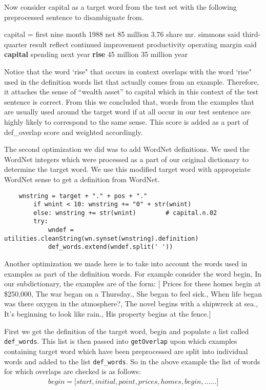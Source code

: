 \documentclass{article}
\begin{document}
Now consider capital as a target word from the test set with the following preprocessed sentence to disambiguate from. \par

capital = first nine month 1988 net 85 million 3.76 share mr. simmons said third-quarter result reflect continued improvement productivity operating margin said \textbf{capital} spending next year \textbf{rise} 45 million 35 million year
\par
Notice that the word `rise" that occurs in context overlaps with the word `rise" used in the definition words list that actually comes from an example. Therefore, it attaches the sense of ``wealth asset'' to capital which in this context of the test sentence is correct. From this we concluded that, words from the examples that are usually used around the target word if at all occur in our test sentence are highly likely to correspond to the same sense. This score is added as a part of def\_overlap score and weighted accordingly.

The second optimization we did was to add WordNet definitions. We used the WordNet integers which were processed as a part of our original dictionary to determine the target word. We use this modified target word with appropriate WordNet sense to get a definition from WordNet. 

\begin{verbatim}
    wnstring = target + "." + pos + "."
        if wnint < 10: wnstring += "0" + str(wnint)
        else: wnstring += str(wnint)        # capital.n.02
        try:
            wndef = utilities.cleanString(wn.synset(wnstring).definition)
            def_words.extend(wndef.split(' '))
\end{verbatim}

Another optimization we made here is to take into account the words used in examples as part of the definition words. For example consider the word begin, In our subdictionary, the examples are of the form: 
$\lbrack$ Prices for these homes begin at \$250,000, The war began on a Thursday., She began to feel sick., When life began was there oxygen in the atmosphere?, The novel begins with a shipwreck at sea., It's beginning to look like rain., His property begins at the fence.$\rbrack$

First we get the definition of the target word, begin and populate a list called \texttt{def\_words}. This list is then passed into \texttt{getOverlap} upon which examples containing target word which have been preprocessed are split into individual words and added to the list \texttt{def\_words}. So in the above example the list of words for which overlaps are checked is as follows: 
\begin{align}
begin = \lbrack start, initial, point, prices, homes, begin,......\rbrack
\end{align}
\end{document}

